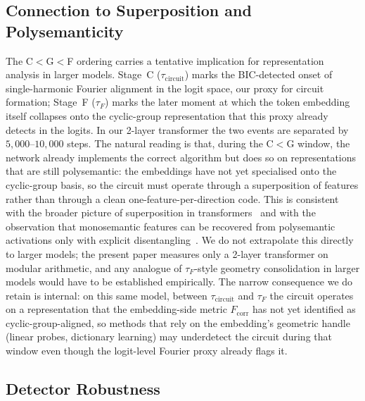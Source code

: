 \documentclass{article}
\newcommand{\tauf}{\tau_{F}}
\newcommand{\taucirc}{\tau_{\mathrm{circuit}}}
\newcommand{\fcorr}{F_{\mathrm{corr}}}
\begin{document}
\subsection{Connection to Superposition and Polysemanticity}
\label{sec:superposition}

The C$<$G$<$F ordering carries a tentative implication for
representation analysis in larger models.
Stage~C ($\taucirc$) marks the BIC-detected onset of
single-harmonic Fourier alignment in the logit space, our
proxy for circuit formation; Stage~F ($\tauf$) marks the later
moment at which the token embedding itself collapses onto the
cyclic-group representation that this proxy already detects in
the logits.
In our 2-layer transformer the two events are separated by
$5{,}000$--$10{,}000$ steps.
The natural reading is that, during the C$<$G window, the network
already implements the correct algorithm but does so on
representations that are still polysemantic: the embeddings
have not yet specialised onto the cyclic-group basis, so the
circuit must operate through a superposition of features rather
than through a clean one-feature-per-direction code.
This is consistent with the broader picture of superposition in
transformers~\citep{elhage2022toy} and with the observation that
monosemantic features can be recovered from polysemantic
activations only with explicit
disentangling~\citep{bricken2023monosemanticity,huben2024sparse}.
We do not extrapolate this directly to larger models; the
present paper measures only a 2-layer transformer on modular
arithmetic, and any analogue of $\tauf$-style geometry
consolidation in larger models would have to be established
empirically. The narrow consequence we do retain is internal: on
this same model, between $\taucirc$ and $\tauf$ the circuit
operates on a representation that the embedding-side metric
$\fcorr$ has not yet identified as cyclic-group-aligned, so
methods that rely on the embedding's geometric handle (linear
probes, dictionary learning) may underdetect the circuit during
that window even though the logit-level Fourier proxy already
flags it.

\subsection{Detector Robustness}
\label{sec:robustness}
\end{document}
